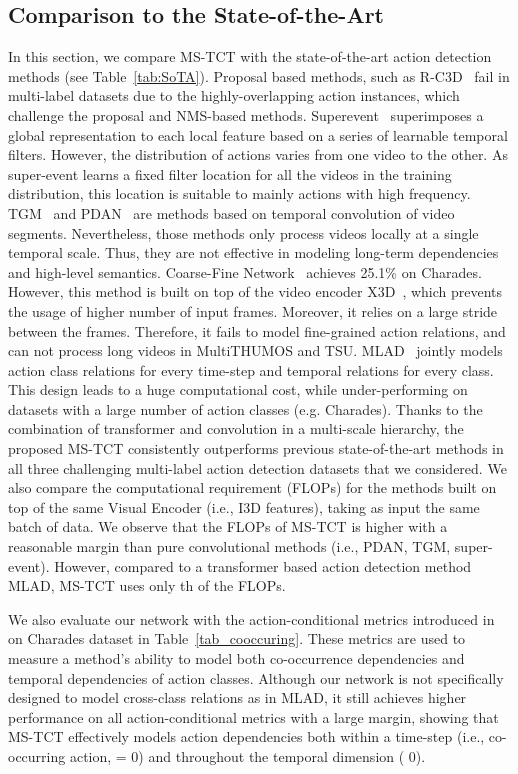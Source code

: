 \documentclass[10pt,twocolumn,letterpaper]{article}
\begin{document}
\subsection{Comparison to the State-of-the-Art }
In this section, we compare MS-TCT with the state-of-the-art action detection methods (see Table~\ref{tab:SoTA}). 
Proposal based methods, such as R-C3D~\cite{RC3d} fail in multi-label datasets due to the highly-overlapping action instances, which challenge the proposal and NMS-based methods. 
Superevent~\cite{superevent} superimposes a global representation to each local feature based on a series of learnable temporal filters. 
However, the distribution of actions varies from one video to the other. As super-event learns a fixed filter location for all the videos in the training distribution, this location is suitable to mainly actions
with high frequency. 
TGM~\cite{TGM1}
and PDAN~\cite{Dai_2021_WACV} are methods based on temporal convolution of video segments. 
Nevertheless, those methods only process videos locally at a single temporal scale. Thus, they are not effective in modeling long-term dependencies and high-level semantics. 
Coarse-Fine Network~\cite{kahatapitiya2021coarse} achieves 25.1\% on Charades. However, this method is built on top of the video encoder X3D~\cite{x3d}, which prevents the usage of higher number of input frames. Moreover, it relies on a large stride between the frames. Therefore, it fails to model fine-grained action relations, and can not process long videos in MultiTHUMOS and TSU.
MLAD~\cite{MLAD} jointly models action class relations for every time-step and temporal relations for every class. This design leads to a huge computational cost, while under-performing on datasets with a large number of action classes (e.g. Charades). 
Thanks to the combination of transformer and convolution in a multi-scale hierarchy, the proposed MS-TCT consistently outperforms previous state-of-the-art methods in all three challenging multi-label action detection datasets that we considered. 
We also compare the computational requirement (FLOPs) for the methods built on top of the same Visual Encoder (i.e., I3D features), taking as input the same batch of data. We observe that the FLOPs of MS-TCT is higher with a reasonable margin than pure convolutional methods (i.e., PDAN, TGM, super-event). 
However, compared to a transformer based action detection method MLAD, MS-TCT uses only th of the FLOPs. 


We also evaluate our network with the action-conditional metrics introduced in~\cite{MLAD} on Charades dataset in Table~\ref{tab_cooccuring}. 
These metrics are used to measure a method’s ability to model both co-occurrence dependencies and temporal dependencies of action classes. 
Although our network is not specifically designed to model cross-class relations as in MLAD, it still achieves higher performance on all action-conditional metrics with a large margin, showing that MS-TCT effectively models action dependencies both within a time-step (i.e., co-occurring action,  = 0) and throughout the temporal dimension ( 0).
\end{document}
